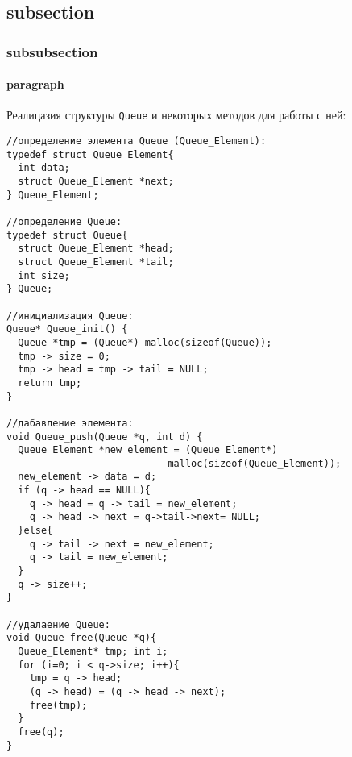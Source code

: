 \subsection{subsection}
\subsubsection{subsubsection}
\paragraph{paragraph}

Реалицазия структуры \texttt{Queue} и некоторых методов для работы с ней:
\begin{verbatim}
//определение элемента Queue (Queue_Element):
typedef struct Queue_Element{
  int data;
  struct Queue_Element *next;
} Queue_Element;

//определение Queue:
typedef struct Queue{
  struct Queue_Element *head;
  struct Queue_Element *tail;
  int size;
} Queue;

//инициализация Queue:
Queue* Queue_init() {
  Queue *tmp = (Queue*) malloc(sizeof(Queue));
  tmp -> size = 0;
  tmp -> head = tmp -> tail = NULL;
  return tmp;
}

//дабавление элемента:
void Queue_push(Queue *q, int d) {
  Queue_Element *new_element = (Queue_Element*)
                            malloc(sizeof(Queue_Element));
  new_element -> data = d;
  if (q -> head == NULL){
    q -> head = q -> tail = new_element;
    q -> head -> next = q->tail->next= NULL;
  }else{
    q -> tail -> next = new_element;
    q -> tail = new_element;
  }
  q -> size++;
}

//удалаение Queue:
void Queue_free(Queue *q){
  Queue_Element* tmp; int i;
  for (i=0; i < q->size; i++){
    tmp = q -> head;
    (q -> head) = (q -> head -> next);
    free(tmp);
  }
  free(q);
}
\end{verbatim}
